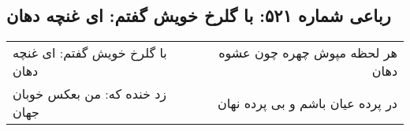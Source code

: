 \begin{center}
\section*{رباعی شماره ۵۲۱: با گلرخ خویش گفتم: ای غنچه دهان}
\label{sec:sh521}
\begin{longtable}{l p{0.5cm} r}
با گلرخ خویش گفتم: ای غنچه دهان
&&
هر لحظه مپوش چهره چون عشوه دهان
\\
زد خنده که: من بعکس خوبان جهان
&&
در پرده عیان باشم و بی پرده نهان
\\
\end{longtable}
\end{center}
